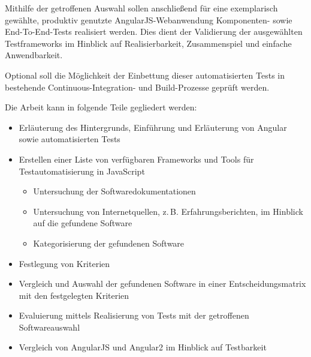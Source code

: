 Mithilfe der getroffenen Auswahl sollen anschließend für eine exemplarisch gewählte, produktiv genutzte AngularJS-Webanwendung Komponenten- sowie End-To-End-Tests realisiert werden. Dies dient der Validierung der ausgewählten Testframeworks im Hinblick auf Realisierbarkeit, Zusammenspiel und einfache Anwendbarkeit.

Optional soll die Möglichkeit der Einbettung dieser automatisierten Tests in bestehende Continuous-Integration- und Build-Prozesse geprüft werden.

Die Arbeit kann in folgende Teile gegliedert werden:
\begin{itemize}
	\item Erläuterung des Hintergrunds, Einführung und Erläuterung von Angular sowie automatisierten Tests
	\item Erstellen einer Liste von verfügbaren Frameworks und Tools für Testautomatisierung in JavaScript
	\begin{itemize}
		\item Untersuchung der Softwaredokumentationen
		\item Untersuchung von Internetquellen, z.\,B. Erfahrungsberichten, im Hinblick auf die gefundene Software
		\item Kategorisierung der gefundenen Software
	\end{itemize}
	\item Festlegung von Kriterien
	\item Vergleich und Auswahl der gefundenen Software in einer Entscheidungsmatrix mit den festgelegten Kriterien
	\item Evaluierung mittels Realisierung von Tests mit der getroffenen Softwareauswahl
	\item Vergleich von AngularJS und Angular2 im Hinblick auf Testbarkeit
\end{itemize}